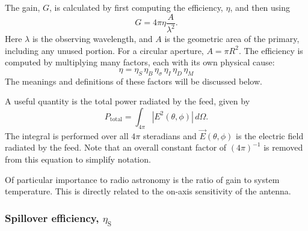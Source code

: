 \documentclass{article}
\begin{document}
The gain, $G$, is calculated by first computing the efficiency, 
$\eta$, and then using 
\begin{equation} \label{eqn:gain}
G = 4 \pi \eta \frac{A}{\lambda^2}.
\end{equation}
Here $\lambda$ is the observing wavelength, and $A$ is the geometric area
of the primary, including any unused portion.  For a circular aperture,
$A = \pi R^2$.  The efficiency is computed by multiplying many factors, each
with its own physical cause:
\begin{equation} \label{eqn:eff}
\eta = \eta_S \, \eta_B \, \eta_{\sigma} \, \eta_I \, \eta_D \, \eta_M
\end{equation}
The meanings and definitions of these factors will be discussed below.

A useful quantity is the total power radiated by the feed, given by
\begin{equation}
P_\mathrm{total} = \int_{4 \pi} \left|E^2(\theta, \phi)\right| \, d \Omega.
\end{equation}
The integral is performed over all $4 \pi$ steradians and 
$\vec{E}(\theta, \phi)$ is the electric field radiated by the feed.
Note that an overall constant factor of $(4 \pi)^{-1}$ is removed from 
this equation to simplify notation.

Of particular importance to radio astronomy is the ratio of gain to 
system temperature.  This is directly related to the on-axis sensitivity 
of the antenna.

\subsubsection{Spillover efficiency, $\eta_\mathrm{S}$}
\end{document}
